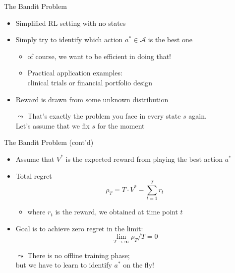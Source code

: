 \begin{frame}[c]{The Bandit Problem}

\begin{itemize}
	\item Simplified RL setting with \alert{no states}
	\item Simply try to identify which action $a^* \in \mathcal{A}$ is the best one
	\begin{itemize}
		\item of course, we want to be efficient in doing that!
		\item Practical application examples:\\ clinical trials or financial portfolio design
	\end{itemize}
	\item Reward is drawn from some unknown distribution
	\bigskip
	\pause
	\item[$\leadsto$] That's exactly the problem you face in every state $s$ again.\\ Let's assume that we fix $s$ for the moment
\end{itemize}

\end{frame}
\begin{frame}[c]{The Bandit Problem (cont'd)}
	
	\begin{itemize}
		\item Assume that $V^*$ is the expected reward from playing the best action $a^*$
		\item Total regret
		$$\rho_T = T \cdot V^* - \sum^T_{t=1} r_t $$
		\begin{itemize}
			\item where $r_t$ is the reward, we obtained at time point $t$
		\end{itemize}
	\medskip
		\item Goal is to achieve zero regret in the limit:
		$$\lim_{T \to \infty} \rho_T / T = 0$$	
		\item[$\leadsto$] There is no offline training phase;\\ but we have to learn to identify $a^*$ on the fly!
	\end{itemize}
	
\end{frame}
